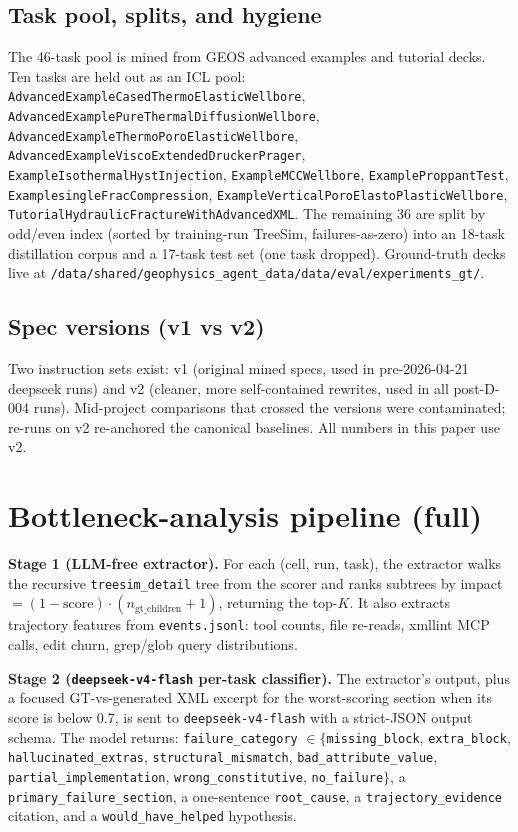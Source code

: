 \documentclass{article}
\begin{document}
\subsection{Task pool, splits, and hygiene}
The 46-task pool is mined from GEOS advanced examples and tutorial decks. Ten tasks are held out as an ICL pool: \texttt{AdvancedExampleCasedThermoElasticWellbore}, \texttt{AdvancedExamplePureThermalDiffusionWellbore}, \texttt{AdvancedExampleThermoPoroElasticWellbore}, \texttt{AdvancedExampleViscoExtendedDruckerPrager}, \texttt{ExampleIsothermalHystInjection}, \texttt{ExampleMCCWellbore}, \texttt{ExampleProppantTest}, \texttt{ExamplesingleFracCompression}, \texttt{ExampleVerticalPoroElastoPlasticWellbore}, \texttt{TutorialHydraulicFractureWithAdvancedXML}. The remaining 36 are split by odd/even index (sorted by training-run TreeSim, failures-as-zero) into an 18-task distillation corpus and a 17-task test set (one task dropped). Ground-truth decks live at \texttt{/data/shared/geophysics\_agent\_data/data/eval/experiments\_gt/}.

\subsection{Spec versions (v1 vs v2)}
Two instruction sets exist: v1 (original mined specs, used in pre-2026-04-21 deepseek runs) and v2 (cleaner, more self-contained rewrites, used in all post-D-004 runs). Mid-project comparisons that crossed the versions were contaminated; re-runs on v2 re-anchored the canonical baselines. All numbers in this paper use v2.

\section{Bottleneck-analysis pipeline (full)}
\label{app:bottleneck}

\textbf{Stage 1 (LLM-free extractor).} For each (cell, run, task), the extractor walks the recursive \texttt{treesim\_detail} tree from the scorer and ranks subtrees by impact $= (1 - \mathrm{score}) \cdot (n_{\mathrm{gt\_children}} + 1)$, returning the top-$K$. It also extracts trajectory features from \texttt{events.jsonl}: tool counts, file re-reads, xmllint MCP calls, edit churn, grep/glob query distributions.

\textbf{Stage 2 (\texttt{deepseek-v4-flash} per-task classifier).} The extractor's output, plus a focused GT-vs-generated XML excerpt for the worst-scoring section when its score is below 0.7, is sent to \texttt{deepseek-v4-flash} with a strict-JSON output schema. The model returns: \texttt{failure\_category} $\in \{$\texttt{missing\_block}, \texttt{extra\_block}, \texttt{hallucinated\_extras}, \texttt{structural\_mismatch}, \texttt{bad\_attribute\_value}, \texttt{partial\_implementation}, \texttt{wrong\_constitutive}, \texttt{no\_failure}$\}$, a \texttt{primary\_failure\_section}, a one-sentence \texttt{root\_cause}, a \texttt{trajectory\_evidence} citation, and a \texttt{would\_have\_helped} hypothesis.
\end{document}

